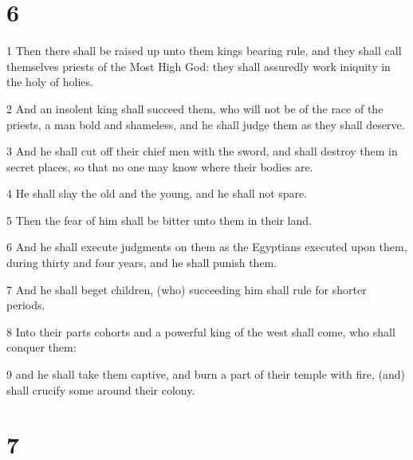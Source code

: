 \chapter{6}

\par 1 Then there shall be raised up unto them kings bearing rule, and they shall call themselves priests of the Most High God: they shall assuredly work iniquity in the holy of holies.
\par 2 And an insolent king shall succeed them, who will not be of the race of the priests, a man bold and shameless, and he shall judge them as they shall deserve.
\par 3 And he shall cut off their chief men with the sword, and shall destroy them in secret places, so that no one may know where their bodies are.
\par 4 He shall slay the old and the young, and he shall not spare.
\par 5 Then the fear of him shall be bitter unto them in their land.
\par 6 And he shall execute judgments on them as the Egyptians executed upon them, during thirty and four years, and he shall punish them.
\par 7 And he shall beget children, (who) succeeding him shall rule for shorter periods.
\par 8 Into their parts cohorts and a powerful king of the west shall come, who shall conquer them:
\par 9 and he shall take them captive, and burn a part of their temple with fire, (and) shall crucify some around their colony.

\chapter{7}


